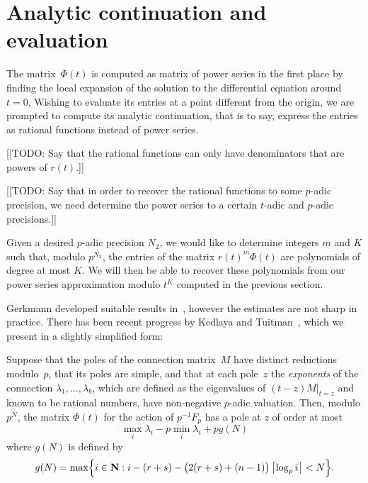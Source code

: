 \section{Analytic continuation and evaluation}

The matrix~$\Phi(t)$ is computed as matrix of power series in the first place 
by finding the local expansion of the solution to the differential equation 
around~$t = 0$.  Wishing to evaluate its entries at a point different 
from the origin, we are prompted to compute its analytic continuation, that is 
to say, express the entries as rational functions instead of power series.

[[TODO:  Say that the rational functions can only have denominators that 
are powers of $r(t)$.]]

[[TODO:  Say that in order to recover the rational functions to some 
$p$-adic precision, we need determine the power series to a certain 
$t$-adic and $p$-adic precisions.]]

Given a desired $p$-adic precision $N_2$, we would like to determine 
integers $m$ and $K$ such that, modulo $p^{N_2}$, the entries of the 
matrix $r(t)^m \Phi(t)$ are polynomials of degree at most $K$.  We 
will then be able to recover these polynomials from our power series 
approximation modulo $t^K$ computed in the previous section.

Gerkmann developed suitable results in~\citep[\S 6]{Gerkmann2007}, 
however the estimates are not sharp in practice.  There has been recent 
progress by Kedlaya and Tuitman~\citep[Theorem~2.1]{KedlayaTuitman2012}, 
which we present in a slightly simplified form:

\begin{thm} \label{thm:KedlayaTuitman}
Suppose that the poles of the connection matrix~$M$ have distinct 
reductions modulo~$p$, that its poles are simple, and that at each 
pole~$z$ the \emph{exponents} of the connection $\lambda_1, \dotsc, \lambda_b$,
which are defined as the eigenvalues of $(t-z) M \vert_{t=z}$ and known to be 
rational numbers, have non-negative $p$-adic valuation.  Then, modulo $p^N$, 
the matrix $\Phi(t)$ for the action of $p^{-1} F_p$ has a pole at $z$ of order 
at most 
\begin{equation} \label{eq:KedlayaTuitman}
\max_{i} \lambda_i - p \min_{i} \lambda_i + p g(N)
\end{equation}
where $g(N)$ is defined by 
\begin{equation}
g(N) = \max\Bigl\{ i \in \mathbf{N} : i - (r+s) - \bigl(2(r+s) + (n-1)\bigr) \left\lceil\log_p i\right\rceil < N \Bigr\}.
\end{equation}
\end{thm}

